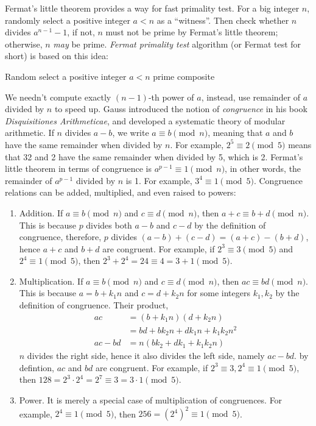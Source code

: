 \documentclass[b5paper]{article}
\begin{document}
Fermat's little theorem provides a way for fast primality test. For a big integer $n$, randomly select a positive integer $a < n$ as a \enquote{witness}. Then check whether $n$ divides $a^{n-1} - 1$, if not, $n$ must not be prime by Fermat's little theorem; otherwise, $n$ \emph{may} be prime. {\em Fermat primality test} algorithm (or Fermat test for short) is based on this idea:

\begin{algorithmic}
  \State Random select a positive integer $a < n$
    \State \Return prime
  \Else
    \State \Return composite
  \EndIf
\EndFunction
\end{algorithmic}

We needn't compute exactly $(n-1)$-th power of $a$, instead, use remainder of $a$ divided by $n$ to speed up. Gauss introduced the notion of \emph{congruence} in his book \emph{Disquisitiones Arithmeticae}, and developed a systematic theory of modular arithmetic. If $n$ divides $a - b$, we write $a \equiv b \pmod{n}$, meaning that $a$ and $b$ have the same remainder when divided by $n$. For example, $2^5 \equiv 2 \pmod{5}$ means that 32 and 2 have the same remainder when divided by 5, which is 2. Fermat's little theorem in terms of congruence is $a^{p-1} \equiv 1 \pmod{n}$, in other words, the remainder of $a^{p-1}$ divided by $n$ is 1. For example, $3^4 \equiv 1 \pmod{5}$. Congruence relations can be added, multiplied, and even raised to powers:

\begin{enumerate}[(1)]
\item Addition. If $a \equiv b \pmod{n}$ and $c \equiv d \pmod{n}$, then $a + c \equiv b + d \pmod{n}$. This is because $p$ divides both $a - b$ and $c - d$ by the definition of congruence, therefore, $p$ divides $(a - b) + (c - d) = (a + c) - (b + d)$, hence $a + c$ and $b + d$ are congruent. For example, if $2^3 \equiv 3 \pmod{5}$ and $2^4 \equiv 1 \pmod{5}$, then $2^3 + 2^4 = 24 \equiv 4 = 3 + 1 \pmod{5}$.

\item Multiplication. If $a \equiv b \pmod{n}$ and $c \equiv d \pmod{n}$, then $ac \equiv bd \pmod{n}$. This is because $a = b + k_1n$ and $c = d + k_2n$ for some integers $k_1, k_2$ by the definition of congruence. Their product,
  \begin{align*}
    ac &= (b + k_1n)(d + k_2n) \\
       &= bd + bk_2n + dk_1n + k_1k_2n^2 \\
    ac - bd &= n(bk_2 + dk_1 + k_1k_2n)
  \end{align*}
$n$ divides the right side, hence it also divides the left side, namely $ac - bd$. by defintion, $ac$ and $bd$ are congruent. For example, if $2^3 \equiv 3, 2^4 \equiv 1 \pmod{5}$, then $128 = 2^3 \cdot 2^4 = 2^7 \equiv 3 = 3 \cdot 1 \pmod{5}$.

\item Power. It is merely a special case of multiplication of congruences. For example, $2^4 \equiv 1 \pmod{5}$, then $256 = (2^4)^2 \equiv 1 \pmod{5}$.
\end{enumerate}
\end{document}
